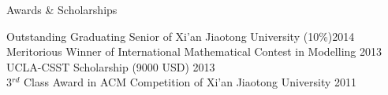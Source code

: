 \documentclass{resume} %
\begin{document}

\begin{rSection}{Awards \& Scholarships}

Outstanding Graduating Senior of Xi'an Jiaotong University (10\%)\hfill 2014 \\
Meritorious Winner of International Mathematical Contest in Modelling \hfill 2013 \\
UCLA-CSST Scholarship (9000 USD) \hfill 2013 \\
3$^{rd}$ Class Award in ACM Competition of Xi'an Jiaotong University \hfill 2011 \\

\end{rSection}
\end{document}
